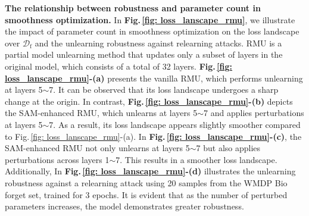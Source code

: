\textbf{The relationship between robustness and parameter count in smoothness optimization.}
In \textbf{Fig.\,\ref{fig: loss_lanscape_rmu}}, we illustrate the impact of parameter count in smoothness optimization on the loss landscape over $\mathcal{D}_\mathrm{f}$ and the unlearning robustness against relearning attacks. RMU is a partial model unlearning method that updates only a subset of layers in the original model, which consists of a total of 32 layers. \textbf{Fig.\,\ref{fig: loss_lanscape_rmu}-(a)} presents the vanilla RMU, which performs unlearning at layers 5$\sim$7. It can be observed that its loss landscape undergoes a sharp change at the origin. In contrast, \textbf{Fig.\,\ref{fig: loss_lanscape_rmu}-(b)} depicts the SAM-enhanced RMU, which unlearns at layers 5$\sim$7 and applies perturbations at layers 5$\sim$7. 
As a result, its loss landscape appears slightly smoother compared to Fig.\,\ref{fig: loss_lanscape_rmu}-(a). In \textbf{Fig.\,\ref{fig: loss_lanscape_rmu}-(c)}, the SAM-enhanced RMU not only unlearns at layers 5$\sim$7 but also applies perturbations across layers 1$\sim$7. 
This results in a smoother loss landscape. Additionally, In \textbf{Fig.\,\ref{fig: loss_lanscape_rmu}-(d)} illustrates the unlearning robustness against a relearning attack using 20 samples from the WMDP Bio forget set, trained for 3 epochs. It is evident that as the number of perturbed parameters increases, the model demonstrates greater robustness.
